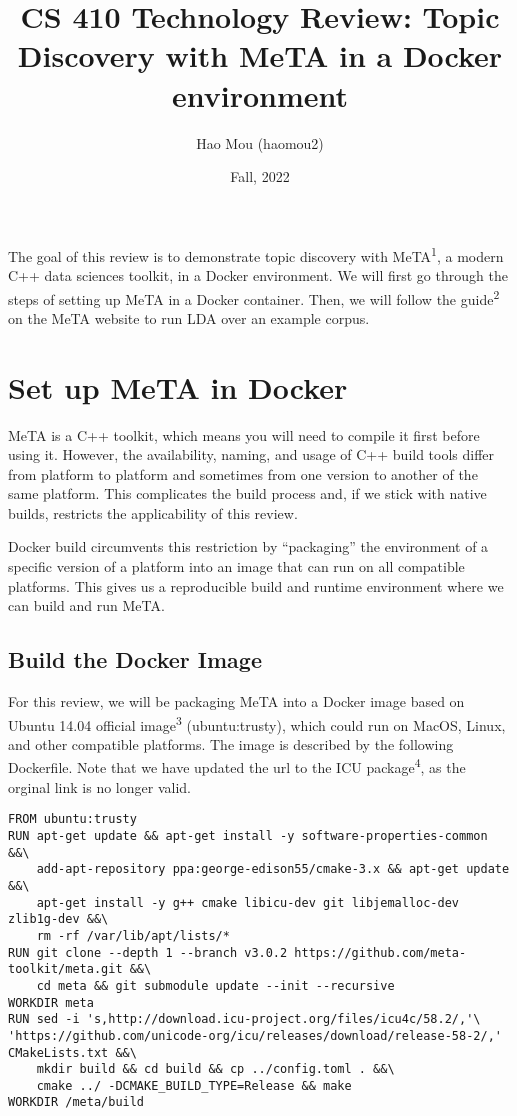 \documentclass[11pt]{article}
\title{CS 410 Technology Review: Topic Discovery with MeTA in a Docker environment}
\author{Hao Mou (haomou2)}
\date{Fall, 2022}
\begin{document}
\maketitle

The goal of this review is to demonstrate topic discovery with MeTA\textsuperscript{1},
a modern C++ data sciences toolkit, in a Docker environment.
We will first go through the steps of setting up MeTA in a Docker container.
Then, we will follow the guide\textsuperscript{2} on the MeTA website to run LDA
over an example corpus.

\section{Set up MeTA in Docker}

MeTA is a C++ toolkit, which means you will need to compile it first before using it.
However, the availability, naming, and usage of C++ build tools differ from platform to platform
and sometimes from one version to another of the same platform.
This complicates the build process and, if we stick with native builds, restricts the applicability
of this review.

Docker build circumvents this restriction by ``packaging'' the environment of a specific version
of a platform into an image that can run on all compatible platforms.
This gives us a reproducible build and runtime environment where we can build and run MeTA.

\subsection{Build the Docker Image}

For this review, we will be packaging MeTA into a Docker image based on Ubuntu 14.04 official
image\textsuperscript{3} (ubuntu:trusty), which could run on MacOS, Linux, and other
compatible platforms. The image is described by the following Dockerfile.
Note that we have updated the url to the ICU package\textsuperscript{4},
as the orginal link is no longer valid.

\begin{verbatim}
FROM ubuntu:trusty
RUN apt-get update && apt-get install -y software-properties-common &&\
    add-apt-repository ppa:george-edison55/cmake-3.x && apt-get update &&\
    apt-get install -y g++ cmake libicu-dev git libjemalloc-dev zlib1g-dev &&\
    rm -rf /var/lib/apt/lists/*
RUN git clone --depth 1 --branch v3.0.2 https://github.com/meta-toolkit/meta.git &&\
    cd meta && git submodule update --init --recursive
WORKDIR meta
RUN sed -i 's,http://download.icu-project.org/files/icu4c/58.2/,'\
'https://github.com/unicode-org/icu/releases/download/release-58-2/,' CMakeLists.txt &&\
    mkdir build && cd build && cp ../config.toml . &&\
    cmake ../ -DCMAKE_BUILD_TYPE=Release && make
WORKDIR /meta/build
\end{verbatim}
\end{document}
